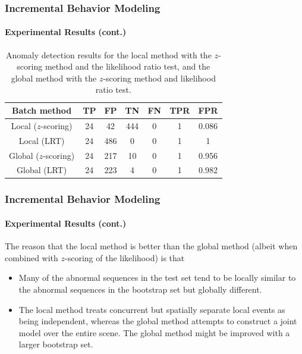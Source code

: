 \begin{frame}
    \frametitle{Incremental Behavior Modeling}
    \framesubtitle{Experimental Results (cont.)}
    
    \begin{table}
        \centering
        \caption{Anomaly detection results for the local method with
            the $z$-scoring method and the likelihood ratio test, and the
            global method with the $z$-scoring method and likelihood ratio
            test.}
        \begin{tabular}{c|c|c|c|c|c|c}
            \hline Batch method & TP & FP & TN & FN & TPR & FPR \\ \hline \hline
            Local ($z$-scoring) & 24 & 42 & 444 & 0 & 1 & 0.086 \\ \hline
            Local (LRT) & 24 & 486 & 0 & 0 & 1 & 1 \\ \hline 
            Global ($z$-scoring) & 24 & 217 & 10 & 0 & 1 & 0.956 \\ \hline 
            Global (LRT) & 24 & 223 & 4 & 0 & 1 & 0.982 \\ \hline
        \end{tabular}
        \label{tab:hmm-based-detection-results}
    \end{table} 

\end{frame}


\begin{frame}
    \frametitle{Incremental Behavior Modeling}
    \framesubtitle{Experimental Results (cont.)}
    
    The reason that the local method is better than the global method
    (albeit when combined with $z$-scoring of the likelihood) is that 
    
    \begin{itemize}
        \item Many of the abnormal sequences in the test set tend to be 
            locally similar to the abnormal sequences in the bootstrap set 
            but globally different. 
        \item The local method treats concurrent but spatially separate
            local events as being independent, whereas the global method 
            attempts to construct a joint model over the entire scene. 
            The global method might be improved with a larger bootstrap set.
    \end{itemize}

\end{frame}

